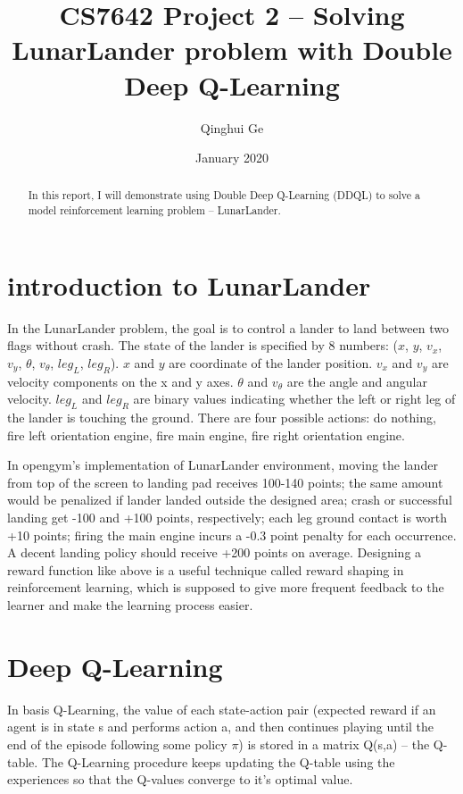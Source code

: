 \documentclass[conference]{IEEEtran}
\title{CS7642 Project 2 -- Solving LunarLander problem with Double Deep Q-Learning}
\author{Qinghui Ge}
\date{January 2020}
\begin{document}
	
	\maketitle
	
\begin{abstract}
	In this report, I will demonstrate using Double Deep Q-Learning (DDQL) to solve a model reinforcement learning problem -- LunarLander. 
\end{abstract}
	
\section{introduction to LunarLander}
In the LunarLander problem, the goal is to control a lander to land between two flags without crash. The state of the lander is specified by 8 numbers: ($x$, $y$, $v_x$, $v_y$, $\theta$, $v_\theta$, $leg_L$, $leg_R$).
$x$ and $y$ are coordinate of the lander position. $v_x$ and $v_y$ are velocity components on the x and y axes. $\theta$ and $v_\theta$ are the angle and angular velocity. $leg_L$ and $leg_R$ are binary values indicating whether the left or right leg of the lander is touching the ground. There are four possible actions: do nothing, fire left orientation engine, fire main engine, fire right orientation engine.

In opengym's implementation of LunarLander environment, moving the lander from top of the screen to landing pad receives 100-140 points; the same amount would be penalized if lander landed outside the designed area; crash or successful landing get -100 and +100 points, respectively; each leg ground contact is worth +10 points; firing the main engine incurs a -0.3 point penalty for each occurrence. A decent landing policy should receive +200 points on average. Designing a reward function like above is a useful technique called reward shaping in reinforcement learning, which is supposed to give more frequent feedback to the learner and make the learning process easier. 

\section{Deep Q-Learning}
In basis Q-Learning, the value of each state-action pair (expected reward if an agent is in state s and performs action a, and then continues playing until the end of the episode following some policy $\pi$) is stored in a matrix Q(s,a) -- the Q-table. The Q-Learning procedure keeps updating the Q-table using the experiences so that the Q-values converge to it's optimal value. 
\end{document}
